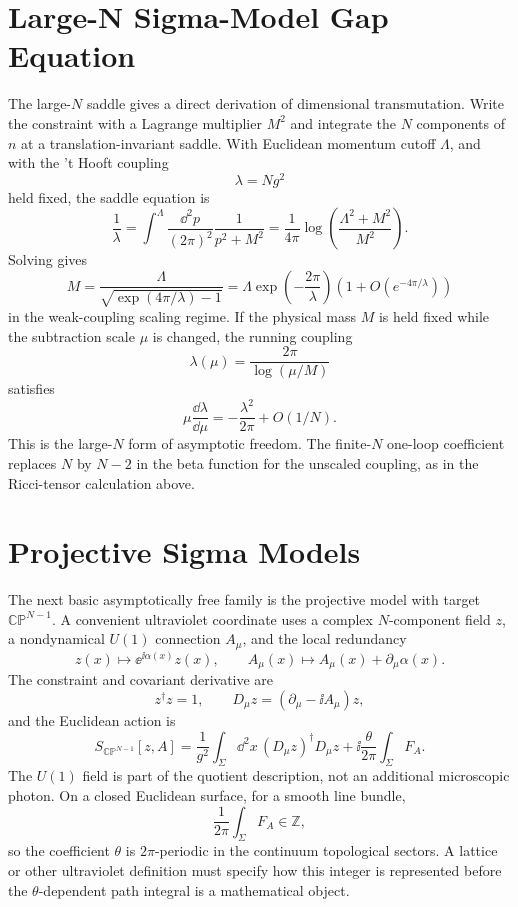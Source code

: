 \section{Large-N Sigma-Model Gap Equation}

The large-\(N\) saddle gives a direct derivation of dimensional transmutation.
Write the constraint with a Lagrange multiplier \(M^2\) and integrate the
\(N\) components of \(n\) at a translation-invariant saddle.  With Euclidean
momentum cutoff \(\Lambda\), and with the 't Hooft coupling
\[
  \lambda=N g^2
\]
held fixed, the saddle equation is
\[
  \frac1{\lambda}
  =
  \int^\Lambda\frac{\dd^2p}{(2\pi)^2}\frac1{p^2+M^2}
  =
  \frac1{4\pi}\log\!\left(\frac{\Lambda^2+M^2}{M^2}\right).
\]
Solving gives
\[
  M
  =
  \frac{\Lambda}{\sqrt{\exp(4\pi/\lambda)-1}}
  =
  \Lambda\exp\!\left(-\frac{2\pi}{\lambda}\right)
  \left(1+O(e^{-4\pi/\lambda})\right)
\]
in the weak-coupling scaling regime.  If the physical mass \(M\) is held
fixed while the subtraction scale \(\mu\) is changed, the running coupling
\[
  \lambda(\mu)=\frac{2\pi}{\log(\mu/M)}
\]
satisfies
\[
  \mu\frac{\dd\lambda}{\dd\mu}
  =
  -\frac{\lambda^2}{2\pi}
  +O(1/N).
\]
This is the large-\(N\) form of asymptotic freedom.  The finite-\(N\)
one-loop coefficient replaces \(N\) by \(N-2\) in the beta function for the
unscaled coupling, as in the Ricci-tensor calculation above.

\section{Projective Sigma Models}
\label{sec:integrable-cpn-sigma-models}

The next basic asymptotically free family is the projective model with target
\(\mathbb{CP}^{N-1}\).  A convenient ultraviolet coordinate uses a complex
\(N\)-component field \(z\), a nondynamical \(U(1)\) connection \(A_\mu\), and
the local redundancy
\[
  z(x)\mapsto \ee^{\ii\alpha(x)}z(x),\qquad
  A_\mu(x)\mapsto A_\mu(x)+\partial_\mu\alpha(x).
\]
The constraint and covariant derivative are
\[
  z^\dagger z=1,\qquad D_\mu z=(\partial_\mu-\ii A_\mu)z,
\]
and the Euclidean action is
\begin{equation}
  S_{\mathbb{CP}^{N-1}}[z,A]
  =
  \frac1{g^2}\int_\Sigma\dd^2x\, (D_\mu z)^\dagger D_\mu z
  +\ii\frac{\theta}{2\pi}\int_\Sigma F_A .
  \label{eq:cpn-action-auxiliary-gauge}
\end{equation}
The \(U(1)\) field is part of the quotient description, not an additional
microscopic photon.  On a closed Euclidean surface, for a smooth line bundle,
\[
  \frac1{2\pi}\int_\Sigma F_A\in\mathbb Z,
\]
so the coefficient \(\theta\) is \(2\pi\)-periodic in the continuum
topological sectors.  A lattice or other ultraviolet definition must specify
how this integer is represented before the \(\theta\)-dependent path integral
is a mathematical object.

